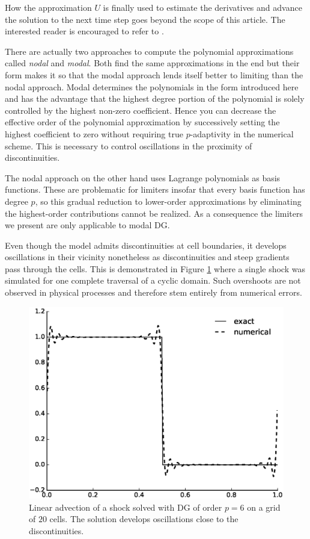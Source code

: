 How the approximation $U$ is finally used to estimate the derivatives and advance the solution to the next time step goes beyond the scope of this article.
The interested reader is encouraged to refer to \cite[Chapter 3]{Hesthaven2007}.

There are actually two approaches to compute the polynomial approximations called \emph{nodal} and \emph{modal}.
Both find the same approximations in the end but their form makes it so that the modal approach lends itself better to limiting than the nodal approach.
Modal determines the polynomials in the form introduced here and has the advantage that the highest degree portion of the polynomial is solely controlled by the highest non-zero coefficient.
Hence you can decrease the effective order of the polynomial approximation by successively setting the highest coefficient to zero without requiring true $p$-adaptivity in the numerical scheme.
This is necessary to control oscillations in the proximity of discontinuities.

The nodal approach on the other hand uses Lagrange polynomials as basis functions.
These are problematic for limiters insofar that every basis function has degree $p$, so this gradual reduction to lower-order approximations by eliminating the highest-order contributions cannot be realized.
As a consequence the limiters we present are only applicable to modal DG.

Even though the model admits discontinuities at cell boundaries, it develops oscillations in their vicinity nonetheless as discontinuities and steep gradients pass through the cells.
This is demonstrated in Figure \ref{fig:dg-oscillations} where a single shock was simulated for one complete traversal of a cyclic domain.
Such overshoots are not observed in physical processes and therefore stem entirely from numerical errors.

\begin{figure}[h]
  \centering
  \includegraphics[width=0.8\columnwidth]{figures/oscillations}
  \caption{Linear advection of a shock solved with DG of order $p = 6$ on a grid of $20$ cells. The solution develops oscillations close to the discontinuities.}
  \label{fig:dg-oscillations}
\end{figure}
